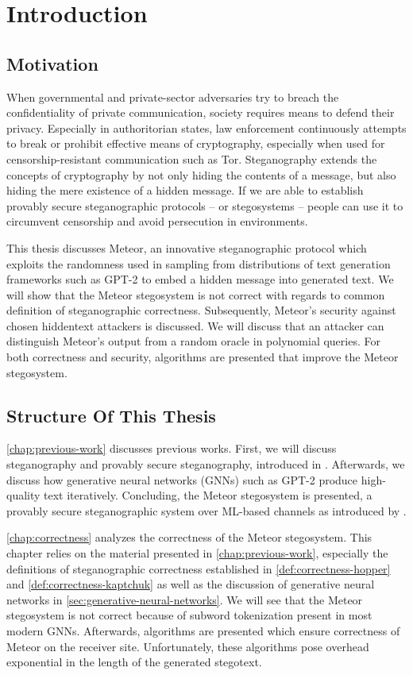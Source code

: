 \chapter{Introduction}

\section{Motivation}

When governmental and private-sector adversaries try to breach the confidentiality of private communication, society requires means to defend their privacy.
Especially in authoritorian states, law enforcement continuously attempts to break or prohibit effective means of cryptography, especially when used for censorship-resistant communication such as Tor.
Steganography extends the concepts of cryptography by not only hiding the contents of a message, but also hiding the mere existence of a hidden message.
If we are able to establish provably secure steganographic protocols -- or stegosystems -- people can use it to circumvent censorship and avoid persecution in environments.

This thesis discusses Meteor, an innovative steganographic protocol which exploits the randomness used in sampling from distributions of text generation frameworks such as GPT-2 to embed a hidden message into generated text.
We will show that the Meteor stegosystem is not correct with regards to common definition of steganographic correctness.
Subsequently, Meteor's security against chosen hiddentext attackers is discussed.
We will discuss that an attacker can distinguish Meteor's output from a random oracle in polynomial queries.
For both correctness and security, algorithms are presented that improve the Meteor stegosystem.



\section{Structure Of This Thesis}

\autoref{chap:previous-work} discusses previous works.
First, we will discuss steganography and provably secure steganography, introduced in \cite{Hopper04}.
Afterwards, we discuss how generative neural networks (GNNs) such as GPT-2 produce high-quality text iteratively.
Concluding, the Meteor stegosystem is presented, a provably secure steganographic system over ML-based channels as introduced by \cite{Meteor2021}.

\autoref{chap:correctness} analyzes the correctness of the Meteor stegosystem. 
This chapter relies on the material presented in \autoref{chap:previous-work}, especially the definitions of steganographic correctness established in \autoref{def:correctness-hopper} and \autoref{def:correctness-kaptchuk} as well as the discussion of generative neural networks in \autoref{sec:generative-neural-networks}.
We will see that the Meteor stegosystem is not correct because of subword tokenization present in most modern GNNs.
Afterwards, algorithms are presented which ensure correctness of Meteor on the receiver site.
Unfortunately, these algorithms pose overhead exponential in the length of the generated stegotext.


